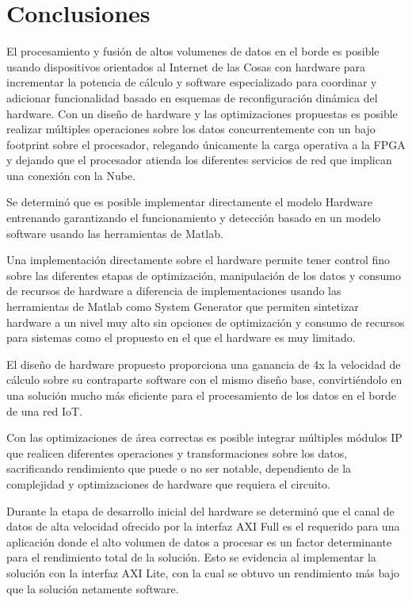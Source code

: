 
\chapter{Conclusiones} %
\label{Chapter14}

El procesamiento y fusión de altos volumenes de datos en el borde es posible usando dispositivos orientados al Internet de las Cosas con hardware para incrementar la potencia de cálculo y software especializado para coordinar y adicionar funcionalidad basado en esquemas de reconfiguración dinámica del hardware. Con un diseño de hardware y las optimizaciones propuestas es posible realizar múltiples operaciones sobre los datos concurrentemente con un bajo footprint sobre el procesador, relegando únicamente la carga operativa a la FPGA y dejando que el procesador atienda los diferentes servicios de red que implican una conexión con la Nube.

Se determinó que es posible implementar directamente el modelo Hardware entrenando garantizando el funcionamiento y detección basado en un modelo software usando las herramientas de Matlab.

Una implementación directamente sobre el hardware permite tener control fino sobre las diferentes etapas de optimización, manipulación de los datos y consumo de recursos de hardware a diferencia de implementaciones usando las herramientas de Matlab como System Generator que permiten sintetizar hardware a un nivel muy alto sin opciones de optimización y consumo de recursos para sistemas como el propuesto en el que el hardware es muy limitado.

El diseño de hardware propuesto proporciona una ganancia de 4x la velocidad de cálculo sobre su contraparte software con el mismo diseño base, convirtiéndolo en una solución mucho más eficiente para el procesamiento de los datos en el borde de una red IoT.

Con las optimizaciones de área correctas es posible integrar múltiples módulos IP que realicen diferentes operaciones y transformaciones sobre los datos, sacrificando rendimiento que puede o no ser notable, dependiento de la complejidad y optimizaciones de hardware que requiera el circuito.

Durante la etapa de desarrollo inicial del hardware se determinó que el canal de datos de alta velocidad ofrecido por la interfaz AXI Full es el requerido para una aplicación donde el alto volumen de datos a procesar es un factor determinante para el rendimiento total de la solución. Esto se evidencia al implementar la solución con la interfaz AXI Lite, con la cual se obtuvo un rendimiento más bajo que la solución netamente software.

